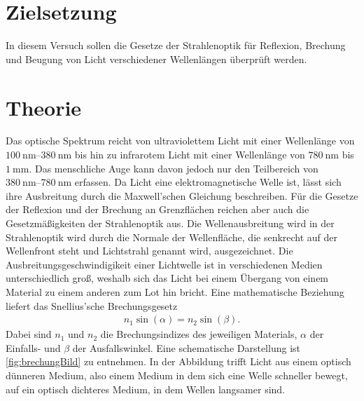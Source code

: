 \section{Zielsetzung}
\label{sec:Ziel}

In diesem Versuch sollen die Gesetze der Strahlenoptik für Reflexion, Brechung und Beugung von Licht verschiedener Wellenlängen überprüft werden.

\section{Theorie}
\label{sec:Theorie}
Das optische Spektrum reicht von ultraviolettem Licht mit einer Wellenlänge von $\SIrange{100}{380}{\nano\meter}$ bis hin zu infrarotem Licht mit einer Wellenlänge
von $\SI{780}{\nano\meter}$ bis $\SI{1}{\mm}$. Das menschliche Auge kann davon jedoch nur den Teilbereich von $\SIrange{380}{780}{\nano\meter}$ erfassen. \newline
Da Licht eine elektromagnetische Welle ist, lässt sich ihre Ausbreitung durch die Maxwell'schen Gleichung beschreiben. Für die Gesetze der Reflexion und der Brechung 
an Grenzflächen reichen aber auch die Gesetzmäßigkeiten der Strahlenoptik aus.\newline
Die Wellenausbreitung wird in der Strahlenoptik wird durch die Normale der Wellenfläche, die senkrecht auf der Wellenfront steht und Lichtstrahl genannt wird, ausgezeichnet.
Die Ausbreitungsgeschwindigikeit einer Lichtwelle ist in verschiedenen Medien unterschiedlich groß, weshalb sich das Licht bei einem Übergang von einem Material zu einem anderen zum Lot hin bricht.
Eine mathematische Beziehung liefert das Snellius'sche Brechungsgesetz
\begin{align}
    \label{eqn:snellius}
    n_1 \sin(\alpha)=n_2\sin(\beta).
\end{align}
Dabei sind $n_1$ und $n_2$ die Brechungsindizes des jeweiligen Materials, $\alpha$ der Einfalls- und $\beta$ der Ausfallswinkel.
Eine schematische Darstellung ist \autoref{fig:brechungBild} zu entnehmen. In der Abbildung trifft Licht aus einem optisch dünneren Medium, also einem Medium in dem sich eine Welle schneller bewegt,
auf ein optisch dichteres Medium, in dem Wellen langsamer sind.

